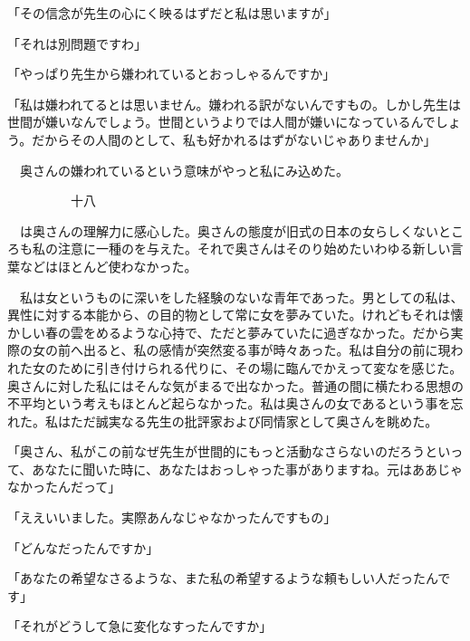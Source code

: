 \documentclass[a4j,onecolumn]{tarticle}
\begin{document}
「その信念が先生の心にく映るはずだと私は思いますが」\par{}
「それは別問題ですわ」\par{}
「やっぱり先生から嫌われているとおっしゃるんですか」\par{}
「私は嫌われてるとは思いません。\hbox{}嫌われる訳がないんですもの。\hbox{}しかし先生は世間が嫌いなんでしょう。\hbox{}世間というよりでは人間が嫌いになっているんでしょう。\hbox{}だからその人間のとして、\hbox{}私も好かれるはずがないじゃありませんか」\par{}
　奥さんの嫌われているという意味がやっと私にみ込めた。\hbox{}\par{}\par{}　　　　　十八
\par{}
　は奥さんの理解力に感心した。\hbox{}奥さんの態度が旧式の日本の女らしくないところも私の注意に一種のを与えた。\hbox{}それで奥さんはそのり始めたいわゆる新しい言葉などはほとんど使わなかった。\hbox{}\par{}
　私は女というものに深いをした経験のないな青年であった。\hbox{}男としての私は、\hbox{}異性に対する本能から、\hbox{}の目的物として常に女を夢みていた。\hbox{}けれどもそれは懐かしい春の雲をめるような心持で、\hbox{}ただと夢みていたに過ぎなかった。\hbox{}だから実際の女の前へ出ると、\hbox{}私の感情が突然変る事が時々あった。\hbox{}私は自分の前に現われた女のために引き付けられる代りに、\hbox{}その場に臨んでかえって変なを感じた。\hbox{}奥さんに対した私にはそんな気がまるで出なかった。\hbox{}普通の間に横たわる思想の不平均という考えもほとんど起らなかった。\hbox{}私は奥さんの女であるという事を忘れた。\hbox{}私はただ誠実なる先生の批評家および同情家として奥さんを眺めた。\hbox{}\par{}
「奥さん、\hbox{}私がこの前なぜ先生が世間的にもっと活動なさらないのだろうといって、\hbox{}あなたに聞いた時に、\hbox{}あなたはおっしゃった事がありますね。\hbox{}元はああじゃなかったんだって」\par{}
「ええいいました。\hbox{}実際あんなじゃなかったんですもの」\par{}
「どんなだったんですか」\par{}
「あなたの希望なさるような、\hbox{}また私の希望するような頼もしい人だったんです」\par{}
「それがどうして急に変化なすったんですか」\par{}
\end{document}

